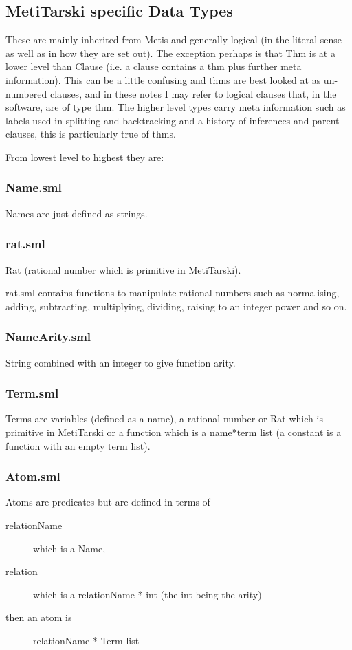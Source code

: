 \documentclass[11pt, oneside]{article}   	%
\begin{document}
\subsection{MetiTarski specific Data Types}
These are mainly inherited from Metis and generally logical (in the literal sense as well as in how they are set out).
The exception perhaps is that Thm is at a lower level than Clause (i.e. a clause contains a thm plus further meta information).
This can be a little confusing and thms are best looked at as un-numbered clauses, and in these notes I may refer to logical clauses
that, in the software, are of type thm.
The higher level types carry meta information such as labels used in splitting and backtracking and a history of inferences and parent clauses, this is particularly true of thms.


From lowest level to highest they are:

\subsubsection{Name.sml}
Names are just defined as strings.


\subsubsection{rat.sml}
Rat (rational number which is primitive in MetiTarski).

rat.sml contains functions to manipulate rational numbers such as normalising, adding, subtracting, multiplying, dividing, raising to an integer power and so on.

\subsubsection{NameArity.sml}
 String combined with an integer to give function arity.

\subsubsection{Term.sml}
Terms are variables (defined as a name), a rational number or Rat which is primitive in MetiTarski or
a function which is a name*term list (a constant is a function with an empty term list).

\subsubsection{Atom.sml}
Atoms are predicates but are defined in terms of 
\begin{description}
\item[relationName] which is a Name,
\item[relation] which is a relationName * int (the int being the arity)

\item[then an atom is] 
relationName * Term list
\end{description}
\end{document}
